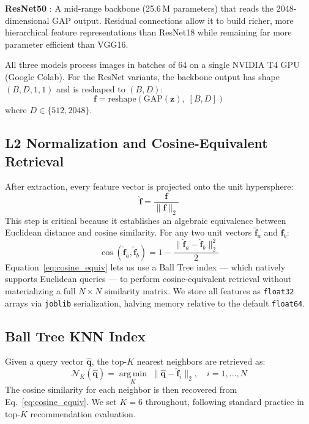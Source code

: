 \documentclass[conference]{IEEEtran}
\begin{document}
\textbf{ResNet50} \cite{he2016resnet}: A mid-range backbone (25.6\,M
parameters) that reads the 2048-dimensional GAP output. Residual
connections allow it to build richer, more hierarchical feature
representations than ResNet18 while remaining far more parameter
efficient than VGG16.

All three models process images in batches of 64 on a single NVIDIA
T4 GPU (Google Colab). For the ResNet variants, the backbone output
has shape $(B, D, 1, 1)$ and is reshaped to $(B, D)$:
\begin{equation}
  \mathbf{f} = \text{reshape}\!\left(\text{GAP}(\mathbf{z}),\;[B, D]\right)
  \label{eq:reshape}
\end{equation}
where $D \in \{512, 2048\}$.

\subsection{L2 Normalization and Cosine-Equivalent Retrieval}

After extraction, every feature vector is projected onto the unit
hypersphere:
\begin{equation}
  \hat{\mathbf{f}} = \frac{\mathbf{f}}{\|\mathbf{f}\|_2}
  \label{eq:l2norm}
\end{equation}
This step is critical because it establishes an algebraic equivalence
between Euclidean distance and cosine similarity. For any two unit
vectors $\hat{\mathbf{f}}_a$ and $\hat{\mathbf{f}}_b$:
\begin{equation}
  \cos(\hat{\mathbf{f}}_a, \hat{\mathbf{f}}_b)
  = 1 - \frac{\|\hat{\mathbf{f}}_a - \hat{\mathbf{f}}_b\|_2^2}{2}
  \label{eq:cosine_equiv}
\end{equation}
Equation~\eqref{eq:cosine_equiv} lets us use a Ball Tree index
\cite{omohundro1989five} --- which natively supports Euclidean queries
--- to perform cosine-equivalent retrieval without materializing a full
$N \times N$ similarity matrix. We store all features as
\texttt{float32} arrays via \texttt{joblib} serialization, halving
memory relative to the default \texttt{float64}.

\subsection{Ball Tree KNN Index}

Given a query vector $\hat{\mathbf{q}}$, the top-$K$ nearest neighbors
are retrieved as:
\begin{equation}
  \mathcal{N}_K(\hat{\mathbf{q}})
  = \operatorname*{arg\,min}_{K}\;
    \|\hat{\mathbf{q}} - \hat{\mathbf{f}}_i\|_2, \quad i = 1,\ldots,N
  \label{eq:knn}
\end{equation}
The cosine similarity for each neighbor is then recovered from
Eq.~\eqref{eq:cosine_equiv}. We set $K{=}6$ throughout, following
standard practice in top-$K$ recommendation evaluation.
\end{document}
